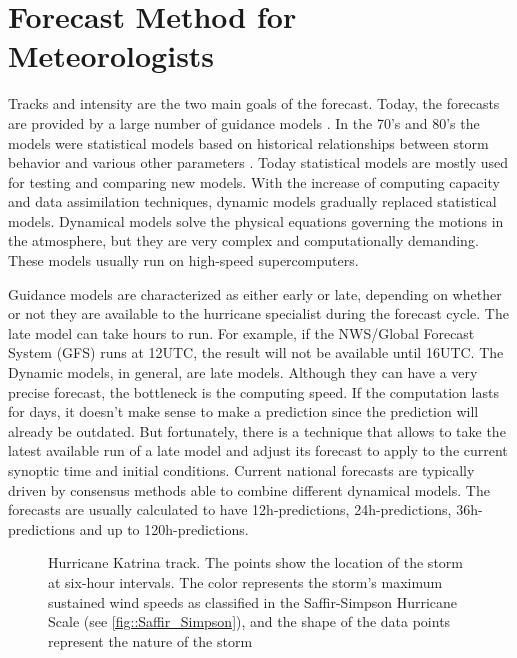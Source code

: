 \section{Forecast Method for Meteorologists}
Tracks and intensity are the two main goals of the forecast. Today, the forecasts are provided by a large number of guidance models \cite{nhc_models}. In the 70's and 80's the models were statistical models based on historical relationships between storm behavior and various other parameters \cite{demaria2005further}. Today statistical models are mostly used for testing and comparing new models. With the increase of computing capacity and data assimilation techniques, dynamic models gradually replaced statistical models. Dynamical models solve the physical equations governing the motions in the atmosphere, but they are very complex and computationally demanding. These models usually run on high-speed supercomputers. 

Guidance models are characterized as either early or late, depending on whether or not they are available to the hurricane specialist during the forecast cycle. \cite{nhc_models} The late model can take hours to run. For example, if the NWS/Global Forecast System (GFS) runs at 12UTC, the result will not be available until 16UTC. The Dynamic models, in general, are late models. Although they can have a very precise forecast, the bottleneck is the computing speed. If the computation lasts for days, it doesn't make sense to make a prediction since the prediction will already be outdated. But fortunately, there is a technique that allows to take the latest available run of a late model and adjust its forecast to apply to the current synoptic time and initial conditions\cite{nhc_models}. Current national forecasts are typically driven by consensus methods able to combine different dynamical models. The forecasts are usually calculated to have 12h-predictions, 24h-predictions, 36h-predictions and up to 120h-predictions. 

\begin{figure}[t]
	\begin{center}
		\hsize {}
	\end{center}
	\caption{Hurricane Katrina track. The points show the location of the storm at six-hour intervals. The color represents the storm's maximum sustained wind speeds as classified in the Saffir-Simpson Hurricane Scale (see \ref{fig::Saffir_Simpson}), and the shape of the data points represent the nature of the storm \cite{katrina_track}}
	\label{fig:Katrina}
\end{figure}




